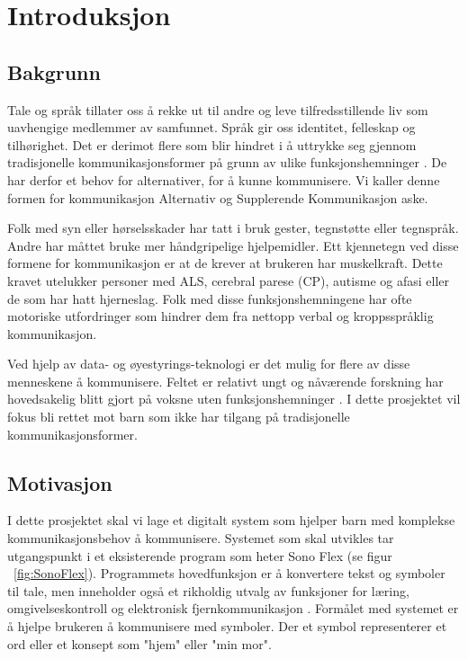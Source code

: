 
\chapter{Introduksjon}


\section{Bakgrunn}
\label{sec:motivasjon}

Tale og språk tillater oss å rekke ut til andre og leve tilfredsstillende liv som uavhengige medlemmer av samfunnet. Språk gir oss identitet, felleskap og tilhørighet. Det er derimot flere som blir hindret i å uttrykke seg gjennom tradisjonelle kommunikasjonsformer på grunn av ulike funksjonshemninger \cite{tobii}. De har derfor et behov for alternativer, for å kunne kommunisere. Vi kaller denne formen for kommunikasjon Alternativ og Supplerende Kommunikasjon \gls{aske}.

Folk med syn eller hørselsskader har tatt i bruk gester, tegnstøtte eller tegnspråk. Andre har måttet bruke mer håndgripelige hjelpemidler. Ett kjennetegn ved disse formene for kommunikasjon er at de krever at brukeren har muskelkraft. Dette kravet utelukker  personer med ALS, cerebral parese (CP), autisme og afasi eller de som har hatt hjerneslag. Folk med disse funksjonshemningene har ofte motoriske utfordringer som hindrer dem fra nettopp verbal og kroppsspråklig kommunikasjon. 

Ved hjelp av data- og øyestyrings-teknologi er det mulig for flere av disse menneskene å kommunisere. Feltet er relativt ungt og nåværende forskning har hovedsakelig blitt gjort på voksne uten funksjonshemninger \cite{aac}. I dette prosjektet vil fokus bli rettet mot barn som ikke har tilgang på tradisjonelle kommunikasjonsformer. 


\section{Motivasjon}
\label{sec:goal}

I dette prosjektet skal vi lage et digitalt system som hjelper barn med komplekse kommunikasjonsbehov å kommunisere. Systemet som skal utvikles tar utgangspunkt i et eksisterende program som heter Sono Flex (se figur ~\ref{fig:SonoFlex}). Programmets hovedfunksjon er å konvertere tekst og symboler til tale, men inneholder også et rikholdig utvalg av funksjoner for læring, omgivelseskontroll og elektronisk fjernkommunikasjon \cite{TobiiCommunicator}. Formålet med systemet er å hjelpe brukeren å kommunisere med symboler. Der et symbol representerer et ord eller et konsept som "hjem" eller "min mor". 

